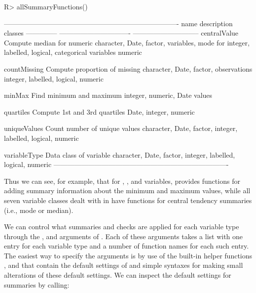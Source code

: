 \documentclass[article,shortnames]{jss}
\begin{document}
\begin{Schunk}
\begin{Sinput}
R> allSummaryFunctions()
\end{Sinput}
\begin{Soutput}
----------------------------------------------------------------------------
name           description                     classes                      
-------------- ------------------------------- -----------------------------
centralValue   Compute median for numeric      character, Date, factor,     
               variables, mode for             integer, labelled, logical,  
               categorical variables           numeric                      

countMissing   Compute proportion of missing   character, Date, factor,     
               observations                    integer, labelled, logical,  
                                               numeric                      

minMax         Find minimum and maximum        integer, numeric, Date       
               values                                                       

quartiles      Compute 1st and 3rd quartiles   Date, integer, numeric       

uniqueValues   Count number of unique values   character, Date, factor,     
                                               integer, labelled, logical,  
                                               numeric                      

variableType   Data class of variable          character, Date, factor,     
                                               integer, labelled, logical,  
                                               numeric                      
----------------------------------------------------------------------------
\end{Soutput}
\end{Schunk}

Thus we can see, for example, that for , ,
and  variables,  provides functions for
adding summary information about the minimum and maximum values, while
all seven variable classes dealt with in  have functions
for central tendency summaries (i.e., mode or median).

We can control what summaries and checks are applied for each variable type
through the ,  and  arguments of . Each of these arguments takes a list with one entry for each variable type and a number of function names for each such entry. The easiest way to specify the arguments is by use of the built-in helper functions ,  and  that contain the default settings of  and simple syntaxes for making small alterations of these default settings.  We can inspect the default settings for summaries by calling:
\end{document}
